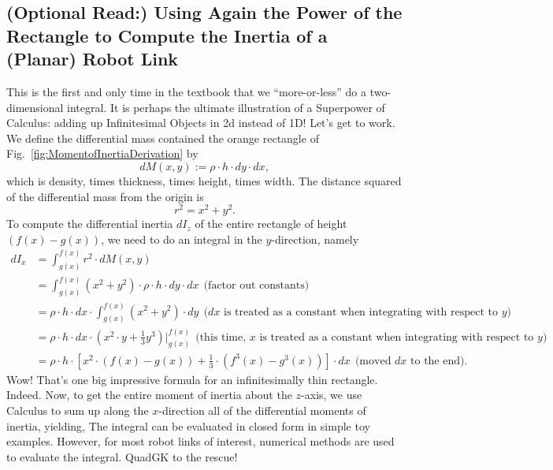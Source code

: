 \subsection{(Optional Read:) Using Again the Power of the Rectangle to Compute the Inertia of a (Planar) Robot Link}
\label{sec:MoementInertiaFirstTime}

This is the first and only time in the textbook that we ``more-or-less'' do a two-dimensional integral. It is perhaps the ultimate illustration of a Superpower of Calculus: adding up Infinitesimal Objects in 2d instead of 1D! Let's get to work. We define the differential mass contained the orange rectangle of Fig.~\ref{fig:MomentofInertiaDerivation} by
\begin{equation}
    dM(x,y) := \rho \cdot h\cdot dy \cdot dx,
\end{equation}
which is density, times thickness, times height, times width. The distance squared of the differential mass from the origin is 
\begin{equation}
    r^2 = x^2 + y^2.
\end{equation}
To compute the differential inertia  $dI_z$ of the entire rectangle of height $(f(x) - g(x))$, we need to do an integral in the $y$-direction, namely
\begin{equation}
    \begin{aligned}
        dI_x &= \int_{g(x)}^{f(x)} r^2 \cdot dM(x, y)  \\
        & = \int_{g(x)}^{f(x)} (x^2 + y^2) \cdot \rho \cdot h\cdot dy \cdot dx ~~\text{(factor out constants)} \\
        & = \rho \cdot h\cdot dx \cdot \int_{g(x)}^{f(x)} (x^2 + y^2) \cdot dy ~~\text{($dx$ is treated as a constant when integrating with respect to $y$)} \\
        &= \rho \cdot h \cdot dx \cdot  (x^2 \cdot y + \frac{1}{3}y^3) \Big|_{g(x)}^{f(x)} ~~\text{(this time, $x$ is treated as a constant when integrating with respect to $y$)} \\
        &= \rho \cdot h\cdot \left[x^2 \cdot \left( f(x) - g(x)\right)   + \frac{1}{3} \cdot \left( f^3(x) - g^3(x)\right) \right] \cdot dx ~~\text{(moved $dx$ to the end)}.
    \end{aligned}
\end{equation}
Wow! That's one big impressive formula for an infinitesimally thin rectangle. Indeed. Now, to get the entire moment of inertia about the $z$-axis, we use Calculus to sum up along the $x$-direction all of the differential moments of inertia, yielding,
The integral can be evaluated in closed form in simple toy examples. However, for most robot links of interest, numerical methods are used to evaluate the integral. QuadGK to the rescue! \\

